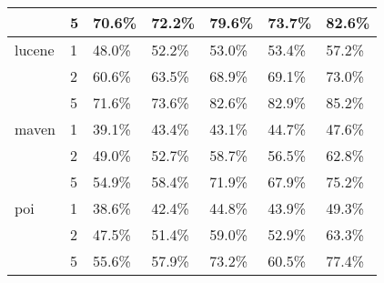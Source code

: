 \begin{table}[t]
\begin{tabular}{l|l|l|l|l|l|l}
          & 5     & 70.6\% & 72.2\% & 79.6\% & 73.7\% & 82.6\% \\
    \hline
     lucene & 1    & 48.0\% & 52.2\% & 53.0\% & 53.4\% & 57.2\% \\
          & 2     & 60.6\% & 63.5\% & 68.9\% & 69.1\% & 73.0\% \\
          & 5     & 71.6\% & 73.6\% & 82.6\% & 82.9\% & 85.2\% \\
    \hline
    maven & 1     & 39.1\% & 43.4\% & 43.1\% & 44.7\% & 47.6\% \\
          & 2     & 49.0\% & 52.7\% & 58.7\% & 56.5\% & 62.8\% \\
          & 5     & 54.9\% & 58.4\% & 71.9\% & 67.9\% & 75.2\% \\
    \hline
    poi   & 1     & 38.6\% & 42.4\% & 44.8\% & 43.9\% & 49.3\% \\
          & 2     & 47.5\% & 51.4\% & 59.0\% & 52.9\% & 63.3\% \\
          & 5     & 55.6\% & 57.9\% & 73.2\% & 60.5\% & 77.4\% \\
    \hline
 \end{tabular}%
  \label{allaccuracytab}%
\end{table}%

